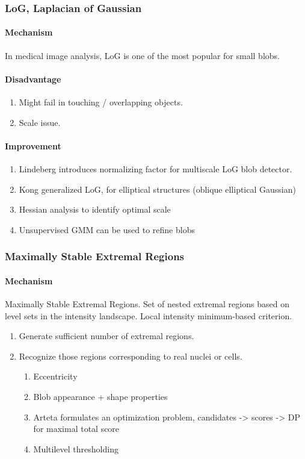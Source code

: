 \documentclass[10pt,a4paper]{article}
\begin{document}
\subsubsection{LoG, Laplacian of Gaussian}
\paragraph{Mechanism}
In medical image analysis, LoG is one of the most popular for small blobs.
\paragraph{Disadvantage}
\begin{enumerate}
	\item Might fail in touching / overlapping objects. 
	\item Scale issue.
\end{enumerate}
\paragraph{Improvement}
\begin{enumerate}
	\item Lindeberg introduces normalizing factor for multiscale LoG blob detector.
	\item Kong generalized LoG, for elliptical structures (oblique elliptical Gaussian)
	\item Hessian analysis to identify optimal scale
	\item Unsupervised GMM can be used to refine blobs
\end{enumerate}

\subsubsection{Maximally Stable Extremal Regions}
\paragraph{Mechanism}
Maximally Stable Extremal Regions. Set of nested extremal regions based on level sets in the intensity landscape. Local intensity minimum-based criterion.
\begin{enumerate}
	\item Generate sufficient number of extremal regions.
	\item Recognize those regions corresponding to real nuclei or cells.
	\begin{enumerate}
		\item Eccentricity
		\item Blob appearance + shape properties
		\item Arteta formulates an optimization problem, candidates -> scores -> DP for maximal total score
		\item Multilevel thresholding
	\end{enumerate}
\end{enumerate}
\end{document}
